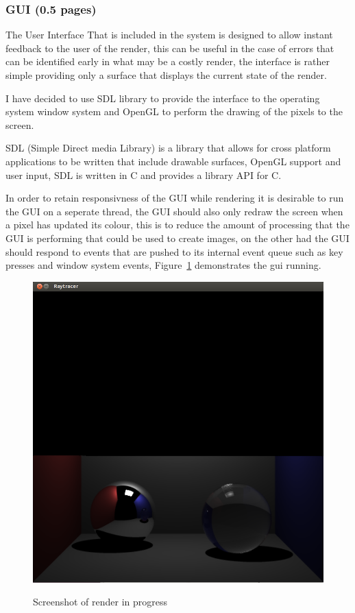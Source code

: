 
\subsubsection{GUI (0.5 pages)}

The User Interface That is included in the system is designed to allow instant feedback to the user of the render, this can be
useful in the case of errors that can be identified early in what may be a costly render, the interface is rather simple
providing only a surface that displays the current state of the render.

I have decided to use SDL library to provide the interface to the operating system window system and OpenGL to perform the 
drawing of the pixels to the screen.

SDL (Simple Direct media Library) is a library that allows for cross platform applications to be written that include
drawable surfaces, OpenGL support and user input, SDL is written in C and provides a library API for C.

In order to retain responsivness of the GUI while rendering it is desirable to run the GUI on a seperate thread, the GUI
should also only redraw the screen when a pixel has updated its colour, this is to reduce the amount of processing that
the GUI is performing that could be used to create images, on the other had the GUI should respond to events that are pushed
to its internal event queue such as key presses and window system events, Figure~\ref{fig:gui_screenshot} demonstrates the
gui running.

\begin{figure}[h]
\centering
\includegraphics[scale=0.3]{./images/gui_screenshot.png}
\label{fig:gui_screenshot}
\caption{Screenshot of render in progress}
\end{figure}
